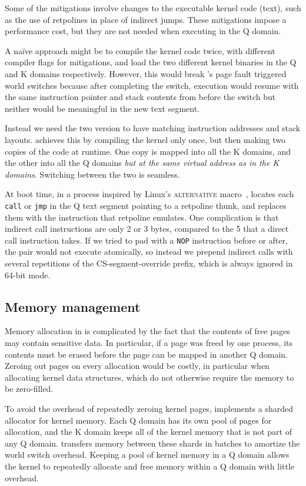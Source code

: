 Some of the mitigations involve changes to the executable kernel code
(text), such as the use of retpolines in place of indirect jumps.
These mitigations impose a performance cost, but they are not needed
when executing in the Q domain.

A na\"ive approach might be to compile the kernel code twice, with
different compiler flags for mitigations, and load the two different kernel
binaries in the Q and K domains respectively. However, this would break \sys's
page fault triggered world switches because after completing the switch,
execution would resume with the same instruction pointer and stack contents
from before the switch but neither would be meaningful in the new text
segment.

Instead we need the two version to have matching instruction addresses and stack
layouts. \sys achieves this by compiling the kernel only once, but then making
two copies of the code at runtime. One copy is mapped into all the K domains,
and the other into all the Q domains \textit{but at the same virtual address
as in the K domains}. Switching between the two is seamless.

At boot time, in a process inspired by Linux's \textsc{alternative}
macro~\cite{lwn:alternative}, \sys locates each \texttt{call} or
\texttt{jmp} in the Q text segment pointing to a retpoline thunk, and
replaces them with the instruction that retpoline emulates. One
complication is that indirect call instructions are only 2 or 3 bytes,
compared to the 5 that a direct call instruction takes. If we tried
to pad with a \texttt{NOP} instruction before or after, the pair would not execute
atomically, so instead we prepend indirect calls with several
repetitions of the CS-segment-override prefix, which is always ignored
in 64-bit mode.


\subsection{Memory management}
\label{ss:mm}

Memory allocation in \sys is complicated by the fact that the contents
of free pages may contain sensitive data.  In particular, if a page was
freed by one process, its contents must be erased before the page can
be mapped in another Q domain.  Zeroing out pages on every allocation
would be costly, in particular when allocating kernel data structures,
which do not otherwise require the memory to be zero-filled.

To avoid the overhead of repeatedly zeroing kernel pages, \sys implements
a sharded allocator for kernel memory.  Each Q domain has its own pool
of pages for allocation, and the K domain keeps all of the kernel memory
that is not part of any Q domain.  \sys transfers memory between these
shards in batches to amortize the world switch overhead.  Keeping a pool
of kernel memory in a Q domain allows the kernel to repeatedly allocate
and free memory within a Q domain with little overhead.

